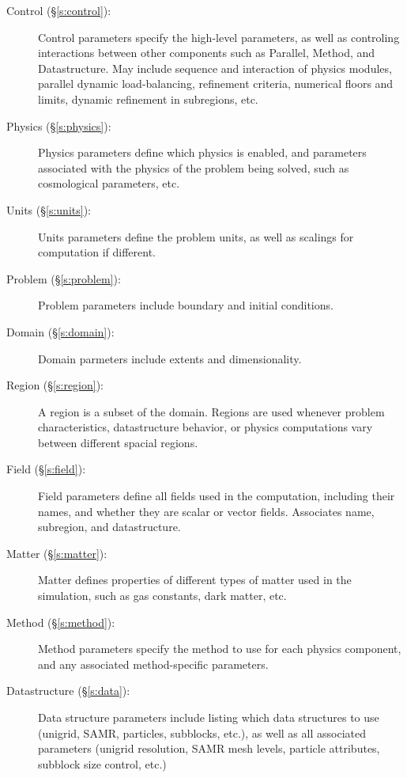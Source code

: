 \documentclass{book}
\begin{document}
\begin{description}

 \item [Control (\S\ref{s:control}): ] Control parameters specify the
 high-level parameters, as well as controling interactions between
 other components such as Parallel, Method, and Datastructure.  May
 include sequence and interaction of physics modules, parallel dynamic
 load-balancing, refinement criteria, numerical floors and limits,
 dynamic refinement in subregions, etc.

 \item [Physics (\S\ref{s:physics}): ] Physics parameters define which
 physics is enabled, and parameters associated with the physics of the
 problem being solved, such as cosmological parameters, etc.

 \item [Units (\S\ref{s:units}): ] Units parameters define the problem
 units, as well as scalings for computation if different.

 \item [Problem (\S\ref{s:problem}): ] Problem parameters include
 boundary and initial conditions.

 \item [Domain (\S\ref{s:domain}): ] Domain parmeters include extents
 and dimensionality.

 \item [Region (\S\ref{s:region}): ] A region is a subset of the
 domain.  Regions are used whenever problem characteristics,
 datastructure behavior, or physics computations vary between
 different spacial regions.

 \item [Field (\S\ref{s:field}): ] Field parameters define all fields
 used in the computation, including their names, and whether they are
 scalar or vector fields.  Associates name, subregion, and
 datastructure.

 \item [Matter (\S\ref{s:matter}): ] Matter defines properties of
 different types of matter used in the simulation, such as gas
 constants, dark matter, etc.

 \item [Method (\S\ref{s:method}): ] Method parameters specify the
 method to use for each physics component, and any associated
 method-specific parameters.

 \item [Datastructure (\S\ref{s:data}): ] Data structure parameters
 include listing which data structures to use (unigrid, SAMR,
 particles, subblocks, etc.), as well as all associated parameters
 (unigrid resolution, SAMR mesh levels, particle attributes, subblock
 size control, etc.)


\end{description}
\end{document}

